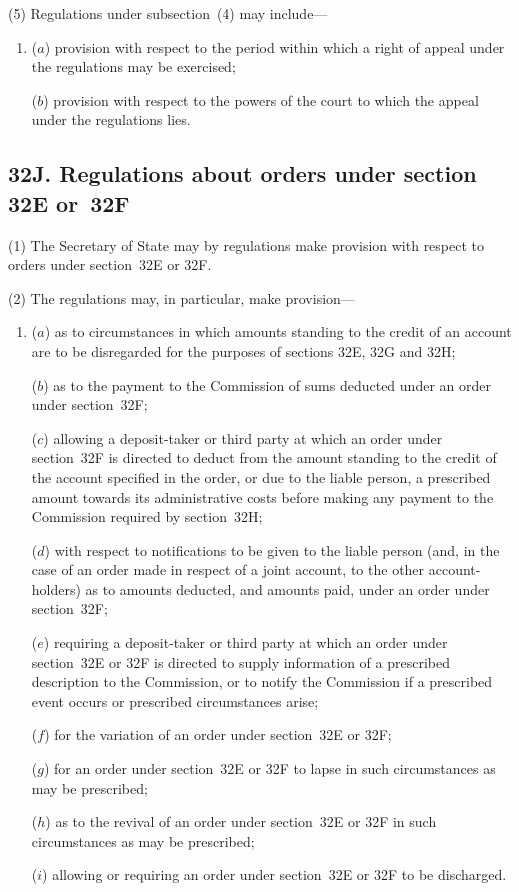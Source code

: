 \documentclass[12pt,a4paper]{article}
\begin{document}
(5) Regulations under subsection~(4) may include---
\begin{enumerate}\item[]
($a$) provision with respect to the period within which a right of appeal under the
regulations may be exercised;

($b$) provision with respect to the powers of the court to which the appeal under
the regulations lies.
\end{enumerate}

\subsection{32J. Regulations about orders under section 32E or~32F}

(1) The Secretary of State may by regulations make provision with respect to orders under section~32E or 32F.

(2) The regulations may, in particular, make provision---
\begin{enumerate}\item[]
($a$) as to circumstances in which amounts standing to the credit of an account are to be disregarded for the purposes of sections 32E, 32G and 32H;

($b$) as to the payment to the Commission of sums deducted under an order under section~32F;

($c$) allowing a deposit-taker or third party at which an order under section~32F is directed to deduct from the amount standing to the credit of the account specified in the order, or due to the liable person, a prescribed amount towards its administrative costs before making any payment to the Commission required by section~32H;

($d$) with respect to notifications to be given to the liable person (and, in the case of an order made in respect of a joint account, to the other account-holders) as to amounts deducted, and amounts paid, under an order under section~32F;

($e$) requiring a deposit-taker or third party at which an order under section~32E or 32F is directed to supply information of a prescribed description to the Commission, or to notify the Commission if a prescribed event occurs or prescribed circumstances arise;

($f$) for the variation of an order under section~32E or 32F;

($g$) for an order under section~32E or 32F to lapse in such circumstances as may be prescribed;

($h$) as to the revival of an order under section~32E or 32F in such circumstances as may be prescribed;

($i$) allowing or requiring an order under section~32E or 32F to be discharged.
\end{enumerate}
\end{document}
